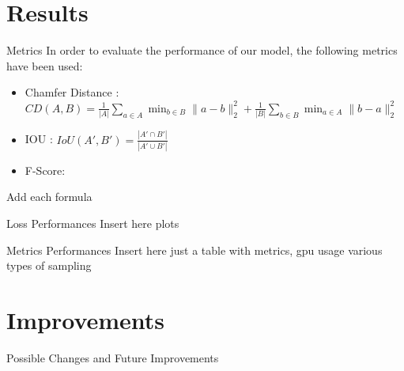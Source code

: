 \documentclass{beamer}
\begin{document}
\section{Results}

\begin{frame}{Metrics}
In order to evaluate the performance of our model, the following metrics have been used:
\begin{itemize}
\item Chamfer Distance : \\ 
$
CD(A, B) = \frac{1}{|A|} \sum_{a \in A} \min_{b \in B} \|a - b\|_2^2 + \frac{1}{|B|} \sum_{b \in B} \min_{a \in A} \|b - a\|_2^2
$
\item IOU : 
$ IoU(A', B') = \frac{|A' \cap B'|}{|A' \cup B'|}$
\item F-Score:
\end{itemize}
Add each formula
\end{frame}

\begin{frame}{Loss Performances}
Insert here plots
\end{frame}

\begin{frame}{Metrics Performances}
Insert here just a table with metrics, gpu usage
various types of sampling
\end{frame}

\section{Improvements}

\begin{frame}{Possible Changes and Future Improvements}
\end{frame}

\backmatter
\end{document}
